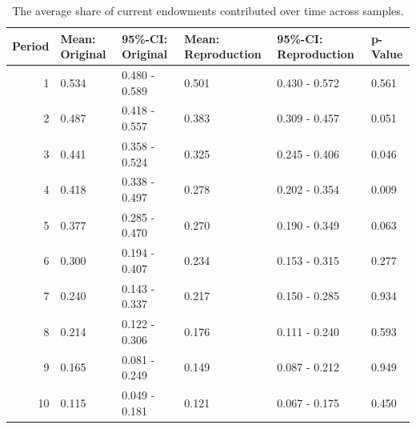 \documentclass[
  authoryear,
  review,
  3p,
  onecolumn]{elsarticle}
\begin{document}
\hypertarget{tbl-share-periods}{}
\begin{table}
\caption{\label{tbl-share-periods}The average share of current endowments contributed over time across
samples. }\tabularnewline

\centering
\begin{tabular}{r|l|l|l|l|l}
\hline
Period & Mean: Original & 95\%-CI: Original & Mean: Reproduction & 95\%-CI: Reproduction & p-Value\\
\hline
1 & 0.534 & 0.480 - 0.589 & 0.501 & 0.430 - 0.572 & 0.561\\
\hline
2 & 0.487 & 0.418 - 0.557 & 0.383 & 0.309 - 0.457 & 0.051\\
\hline
3 & 0.441 & 0.358 - 0.524 & 0.325 & 0.245 - 0.406 & 0.046\\
\hline
4 & 0.418 & 0.338 - 0.497 & 0.278 & 0.202 - 0.354 & 0.009\\
\hline
5 & 0.377 & 0.285 - 0.470 & 0.270 & 0.190 - 0.349 & 0.063\\
\hline
6 & 0.300 & 0.194 - 0.407 & 0.234 & 0.153 - 0.315 & 0.277\\
\hline
7 & 0.240 & 0.143 - 0.337 & 0.217 & 0.150 - 0.285 & 0.934\\
\hline
8 & 0.214 & 0.122 - 0.306 & 0.176 & 0.111 - 0.240 & 0.593\\
\hline
9 & 0.165 & 0.081 - 0.249 & 0.149 & 0.087 - 0.212 & 0.949\\
\hline
10 & 0.115 & 0.049 - 0.181 & 0.121 & 0.067 - 0.175 & 0.450\\
\hline
\end{tabular}
\end{table}
\end{document}

